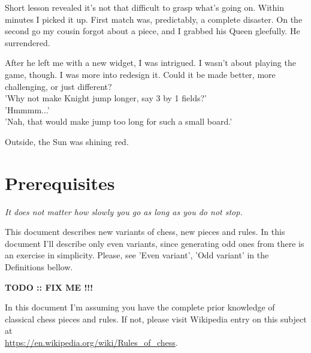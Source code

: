 \documentclass[a5paper,12pt,draft]{book} %
\begin{document}
Short lesson revealed it's not that difficult to grasp what's going
on. Within minutes I picked it up. First match was, predictably, a
complete disaster. On the second go my cousin forgot about a piece,
and I grabbed his Queen gleefully. He surrendered.

After he left me with a new widget, I was intrigued. I wasn't
about playing the game, though. I was more into redesign it. Could it
be made better, more challenging, or just different? \\
'Why not make Knight jump longer, say 3 by 1 fields?' \\
'Hmmmm...' \\
'Nah, that would make jump too long for such a small board.'

Outside, the Sun was shining red.
\clearpage

\chapter*{Prerequisites}

\begin{flushright}
\parbox{0.7\textwidth}{
\emph{It does not matter how slowly you go as long as you do not stop. \\
 } }
\end{flushright}

This document describes new variants of chess, new pieces
and rules. In this document I'll describe only even variants, since
generating odd ones from there is an exercise in simplicity. Please,
see 'Even variant', 'Odd variant' in the Definitions bellow.

\textbf{\huge{TODO :: FIX ME !!!}} %

In this document I'm assuming you have the complete prior
knowledge of classical chess pieces and rules. If not, please visit
Wikipedia entry on this subject at \\
\href{https://en.wikipedia.org/wiki/Rules\_of\_chess}{https://en.wikipedia.org/wiki/Rules\_of\_chess}.
\clearpage

\end{document}
